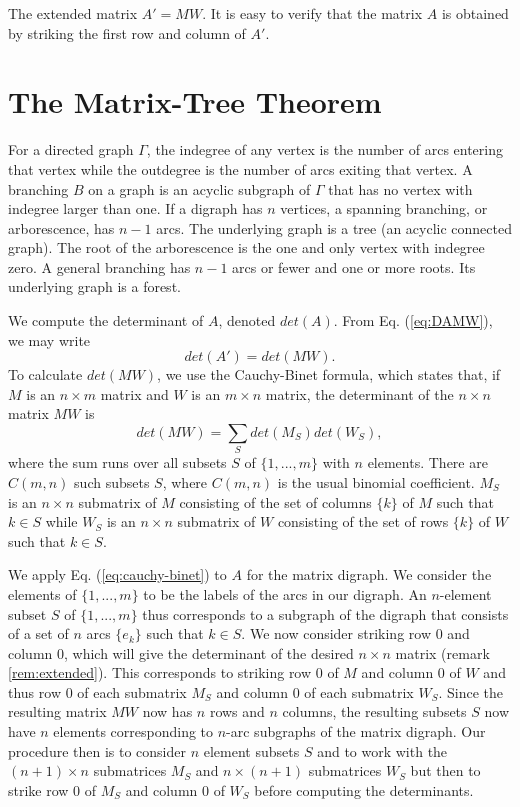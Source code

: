 \documentclass{article}
\begin{document}
The extended matrix $A' = M W$.  It is easy to verify that the matrix $A$ is obtained by striking the first row and column of $A'$.

\section{The Matrix-Tree Theorem}

For a directed graph $\Gamma$, the indegree of any vertex is the number of arcs
entering that vertex while the outdegree is the number of
arcs exiting that vertex.  A branching $B$ on a graph is an acyclic subgraph
of $\Gamma$ that has no vertex with indegree larger than one.
If a digraph has $n$ vertices, a spanning branching, or arborescence,
has $n-1$ arcs.  The underlying graph is a tree (an acyclic connected graph).
The root of the arborescence is the one and only vertex with indegree zero.
A general branching has $n-1$ arcs or fewer and one or more roots.
Its underlying graph is a forest.

We compute the determinant of $A$,
denoted $det(A)$.
From Eq. (\ref{eq:DAMW}), we may write
\begin{equation}
det(A') = det(M W).
\label{eq:detDAMW}
\end{equation}
To calculate $det(M W)$,
we use the Cauchy-Binet formula, which states that,
if $M$ is an $n \times m$ matrix and $W$ is an $m \times n$ matrix,
the determinant of the $n \times n$ matrix $MW$ is
\begin{equation}
det(M W) = \sum_S det(M_S) det(W_S),
\label{eq:cauchy-binet}
\end{equation}
where the sum runs over all subsets $S$ of $\{1, ..., m\}$ with $n$ elements.
There are $C(m,n)$ such subsets $S$, where $C(m,n)$ is the usual binomial
coefficient.  $M_S$ is an $n \times n$
submatrix of $M$ consisting of the set of columns
$\{k\}$ of $M$ such that $k \in S$ while $W_S$ is an $n \times n$
submatrix of $W$ 
consisting of the set of rows $\{k\}$ of $W$ such that $k \in S$.

We apply Eq. (\ref{eq:cauchy-binet}) to $A$ for the
matrix digraph.
We consider the elements of $\{1, ..., m\}$ to be the labels of the
arcs in our digraph.  An $n$-element subset $S$ of
$\{1, ..., m\}$ thus corresponds to a subgraph of the digraph that
consists of a set of $n$ arcs $\{e_k\}$ such that $k \in S$.
We now consider striking row $0$ and column $0$, which will give the
determinant of the desired $n \times n$
matrix (remark \ref{rem:extended}).
This corresponds to striking row $0$ of $M$ and column $0$ of $W$ and thus
row $0$ of each submatrix $M_S$ and column $0$ of each submatrix $W_S$.
Since the resulting matrix $MW$ now has $n$ rows and $n$ columns,
the resulting subsets $S$ now have $n$ elements corresponding to $n$-arc
subgraphs of the matrix digraph.  Our procedure then is
to consider $n$ element subsets $S$ and
to work with the $(n + 1) \times n$ submatrices $M_S$ and
$n \times (n + 1)$
submatrices $W_S$ but then to strike row $0$ of $M_S$ and column $0$ of
$W_S$ before computing the determinants.
\end{document}
